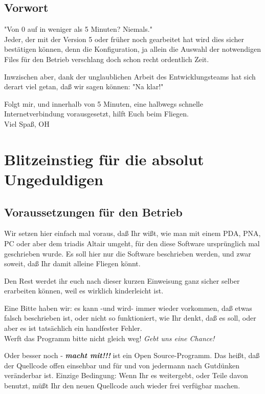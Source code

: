 \newpage
\section*{Vorwort}
"Von 0 auf \xc in weniger als 5 Minuten? Niemals." \\

Jeder, der mit der Version 5 oder früher noch gearbeitet hat wird dies sicher bestätigen können, denn die Konfiguration, ja allein die Auswahl der notwendigen Files für den Betrieb verschlang doch schon recht ordentlich Zeit. 


 Inwzischen aber, dank der unglaublichen Arbeit des Entwicklungsteams hat sich derart viel getan, daß wir sagen können: "Na klar!"
 
 
 Folgt mir, und innerhalb von 5 Minuten, eine halbwegs schnelle Internetverbindung vorausgesetzt, \xc hilft Euch beim Fliegen. \\[2em]
 
Viel Spaß, OH
\chapter{Blitzeinstieg für die absolut Ungeduldigen}\label{Blitzeinstieg}
\section{Voraussetzungen für den Betrieb}
Wir setzen hier einfach mal voraus, daß Ihr wißt, wie man mit einem \textsf{PDA}, \textsf{PNA}, \textsf{PC} oder aber dem  triadis \textsf{Altair} umgeht,  für den diese Software ursprünglich mal geschrieben wurde. Es soll hier nur die Software beschrieben werden, und zwar soweit, daß Ihr damit alleine Fliegen könnt.

Den Rest werdet ihr euch nach dieser kurzen Einweisung ganz sicher selber erarbeiten können, weil es wirklich kinderleicht ist.

Eine Bitte haben wir: es kann -und wird- immer wieder vorkommen, daß etwas falsch beschrieben ist, oder nicht so funktioniert, wie Ihr denkt, daß es soll, oder aber es ist tatsächlich ein handfester Fehler.\\[1em]

Werft das Programm bitte nicht gleich weg! \textsl{Gebt  uns eine Chance!}

Oder besser noch - \textsl{\textbf{macht mit!!!}} \xc ist ein Open Source-Programm. Das heißt, daß der Quellcode offen einsehbar und für und von jedermann nach Gutdünken veränderbar ist. Einzige Bedingung: Wenn Ihr es weitergebt, oder Teile davon benutzt, müßt Ihr den neuen Quellcode auch wieder frei verfügbar machen.\\

